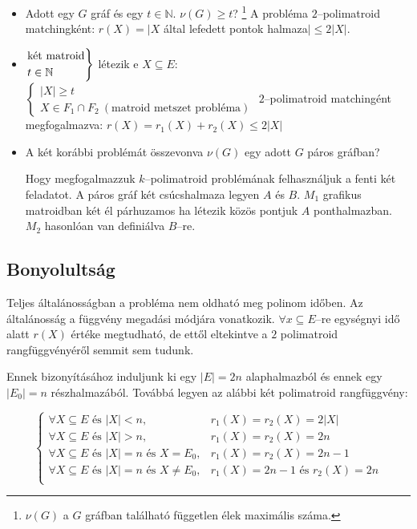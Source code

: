 \begin{itemize}
	\item Adott egy $G$ gráf és egy $t \in \mathbb{N}$. $\nu(G) \geq t$? \footnote{
		      $\nu(G)$ a $G$ gráfban található független élek maximális száma.
	      } A probléma $2$--polimatroid matchingként: $r(X)=|X$
	      által lefedett pontok halmaza$| \leq 2|X|$.
	\item $\begin{rcases}
			      \mbox{két matroid} \\
			      t \in \mathbb{N}
		      \end{rcases}$ létezik  e $X \subseteq E$: $\begin{cases}
			      |X| \geq t \\
			      X \in F_1 \cap F_2~(\mbox{matroid metszet probléma})
		      \end{cases}$
	      $2$--polimatroid matchingént megfogalmazva: $r(X)=r_1(X)+r_2(X) \leq 2|X|$
	\item A két korábbi problémát összevonva $\nu(G)$ egy adott $G$ páros gráfban?

	      Hogy megfogalmazzuk $k$--polimatroid problémának felhasználjuk a fenti két
	      feladatot. A páros gráf két csúcshalmaza legyen $A$ és $B$. $M_1$ grafikus
	      matroidban két él párhuzamos ha létezik közös pontjuk $A$ ponthalmazban.
	      $M_2$ hasonlóan van definiálva $B$--re.
\end{itemize}

\subsection{Bonyolultság}
Teljes általánosságban a probléma nem oldható meg polinom időben. Az általánosság
a függvény megadási módjára vonatkozik. $\forall x \subseteq E$--re egységnyi
idő alatt $r(X)$ értéke megtudható, de ettől eltekintve a $2$ polimatroid
rangfüggvényéről semmit sem tudunk.

Ennek bizonyításához induljunk ki egy $|E|=2n$ alaphalmazból és ennek egy
$|E_0|=n$ részhalmazából. Továbbá legyen az alábbi két polimatroid rangfüggvény:

\[
	\begin{cases}
		\forall X \subseteq E \mbox{ és } |X|<n,                        & r_1(X)=r_2(X)=2|X|               \\
		\forall X \subseteq E \mbox{ és } |X|>n,                        & r_1(X)=r_2(X)=2n                 \\
		\forall X \subseteq E \mbox{ és } |X|=n \mbox{ és } X = E_0,    & r_1(X)=r_2(X)=2n-1               \\
		\forall X \subseteq E \mbox{ és } |X|=n \mbox{ és } X \neq E_0, & r_1(X)=2n-1 \mbox{ és }r_2(X)=2n \\
	\end{cases}
\]

